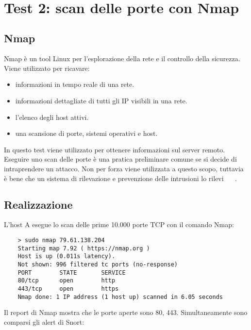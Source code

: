 ~\cite{AdvancedIDSTechniquest}


\section{Test 2: scan delle porte con Nmap}

\subsection{Nmap}
Nmap è un tool Linux per l'esplorazione della rete e il controllo della sicurezza.
Viene utilizzato per ricavare:
\begin{itemize}
    \item informazioni in tempo reale di una rete.
    \item informazioni dettagliate di tutti gli IP visibili in una rete.
    \item l'elenco degli host attivi.
    \item una scansione di porte, sistemi operativi e host.
\end{itemize}

In questo test viene utilizzato per ottenere informazioni sul server remoto. Eseguire uno scan delle porte è una pratica preliminare comune se si decide di intraprendere un attacco. Non per forza viene utilizzata a questo scopo, tuttavia è bene che un sistema di rilevazione e prevenzione delle intrusioni lo rilevi ~\cite{geeksforgeeks} ~\cite{frankfu}.

\subsection{Realizzazione}

L'host A esegue lo scan delle prime 10.000 porte TCP con il comando Nmap:

\begin{verbatim}
    > sudo nmap 79.61.138.204
    Starting map 7.92 ( https://nmap.org )
    Host is up (0.011s latency).
    Not shown: 996 filtered tc ports (no-response)
    PORT        STATE       SERVICE
    80/tcp      open        http
    443/tcp     open        https
    Nmap done: 1 IP address (1 host up) scanned in 6.05 seconds
\end{verbatim}

Il report di Nmap mostra che le porte aperte sono 80, 443.
Simultaneamente sono comparsi gli alert di Snort:

